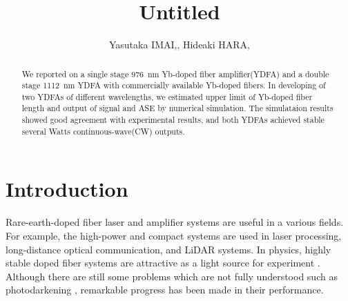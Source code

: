 \documentclass{osa-article}
\begin{document}
\title{Untitled}

\author{Yasutaka IMAI,, Hideaki HARA,}

\address{Reserch Institute for Interdisciplinary Science, Okayama University, Okayama, Japan}

\begin{abstract}
We reported on a single stage \SI{976}{nm} Yb-doped fiber amplifier(YDFA) and a double stage \SI{1112}{nm} YDFA with commercially available Yb-doped fibers.
In developing of two YDFAs of different wavelengths, we estimated upper limit of Yb-doped fiber length and output of signal and ASE by numerical simulation.
The simulataion results showed good agreement with experimental results, and both YDFAs achieved stable several Watts continuous-wave(CW) outputs.
\end{abstract}

\listoftodos
\section{Introduction}
Rare-earth-doped fiber laser and amplifier systems are useful in a various fields.
For example, the high-power and compact systems are used in laser processing, long-distance optical communication, and LiDAR systems.
In physics, highly stable doped fiber systems are attractive as a light source for experiment \cite{burkleyYbFiberAmplifier2017, coluccelliOpticalFrequencyComb2016}.
Although there are still some problems which are not fully understood such as photodarkening \cite{paschottaLifetimeQuenchingYbdoped1997}, remarkable progress has been made in their performance.
\end{document}
